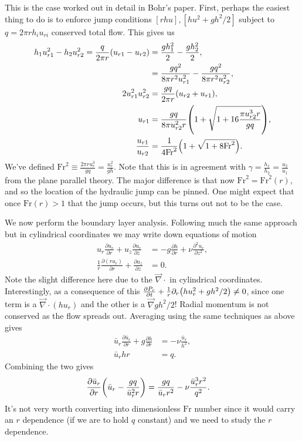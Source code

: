 \documentclass[11pt,
        usenames, %
        dvipsnames %
    ]{report}
\newcommand*{\pd}[2]{\frac{\partial#1}{\partial#2}}
\newcommand*{\ptd}[2]{\frac{\partial^2 #1}{\partial#2^2}}
\DeclarePairedDelimiter\p{\lparen}{\rparen}
\begin{document}
This is the case worked out in detail in Bohr's paper. First, perhaps the
easiest thing to do is to enforce jump conditions $[rhu], [hu^2 + gh^2/2]$
subject to $q = 2\pi rh_iu_{ri}$ conserved total flow. This gives us
\begin{align}
    h_1u_{r1}^2 - h_2u_{r2}^2 = \frac{q}{2\pi r}(u_{r1} - u_{r2})
        &= \frac{gh_1^2}{2} - \frac{gh_2^2}{2},\\
        &= \frac{gq^2}{8\pi r^2u_{r1}^2} - \frac{gq^2}{8\pi r^2u_{r2}^2}
            ,\nonumber\\
    2u_{r1}^2 u_{r2}^2 &= \frac{gq}{2\pi r}\p*{u_{r2} + u_{r1}},\nonumber\\
    u_{r1} &= \frac{gq}{8\pi u_{r2}^2r} \p*{1 +
        \sqrt{1 + 16\frac{\pi u_{r2}^3r}{gq}}},\\
    \frac{u_{r1}}{u_{r2}} &= \frac{1}{4\mathrm{Fr}^2}\p*{1 +
        \sqrt{1 + 8\mathrm{Fr}^2}}.
\end{align}
We've defined $\mathrm{Fr}^2 \equiv \frac{2\pi r u_r^3}{gq} = \frac{u_r^2}{gh}$.
Note that this is in agreement with $\gamma = \frac{h_1}{h_2} = \frac{u_2}{u_1}$
from the plane parallel theory. The major difference is that now $\mathrm{Fr}^2
= \mathrm{Fr}^2(r)$, and so the location of the hydraulic jump can be pinned.
One might expect that once $\mathrm{Fr}(r) > 1$ that the jump occurs, but this
turns out not to be the case.

We now perform the boundary layer analysis. Following much the same approach but
in cylindrical coordinates we may write down equations of motion
\begin{align}
    u_r \pd{u_r}{r} + u_z \pd{u_r}{z} &= -g\pd{h}{r} + \nu
        \ptd{u_r}{z},\nonumber\\
    \frac{1}{r}\pd{(ru_r)}{r} + \pd{u_z}{z} &= 0.
\end{align}
Note the slight difference here due to the $\vec{\nabla} \cdot$ in cylindrical
coordinates. Interestingly, as a consequence of this $\pd{P_r}{t} +
\frac{1}{r}\partial_r \p*{hu_r^2 + gh^2/2} \neq 0$, since one term is a
$\vec{\nabla} \cdot (hu_r)$ and the other is a $\vec{\nabla}gh^2/2$! Radial
momentum is not conserved as the flow spreads out. Averaging using the same
techniques as above gives
\begin{align}
    \bar{u}_r\pd{\bar{u}_r}{r} + g\pd{h}{r} &= -\nu \frac{\bar{u}_r}{h^2},\nonumber\\
    \bar{u}_rhr &= q.
\end{align}
Combining the two gives
\begin{align}
    \pd{\bar{u}_r}{r}\p*{\bar{u}_r - \frac{gq}{\bar{u}_r^2r}}
        &= \frac{gq}{\bar{u}_rr^2} - \nu\frac{\bar{u}_r^3r^2}{q^2}.
        \label{eq:2d_hjump}
\end{align}
It's not very worth converting into dimensionless $\mathrm{Fr}$ number since it
would carry an $r$ dependence (if we are to hold $q$ constant) and we need to
study the $r$ dependence.
\end{document}
